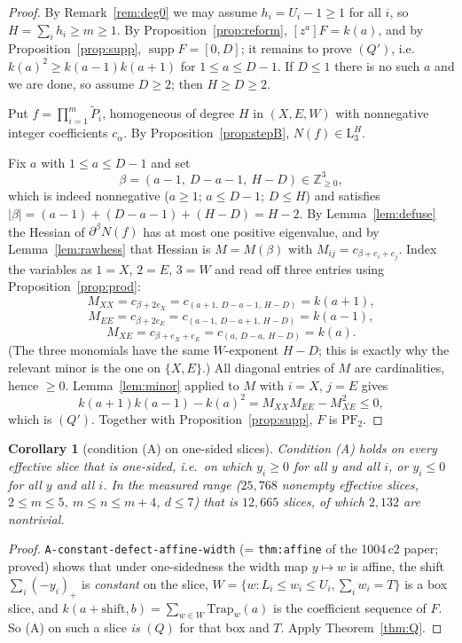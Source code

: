 \documentclass[11pt]{article}
\theoremstyle{plain}
\newtheorem{corollary}[theorem]{Corollary}
\theoremstyle{definition}
\DeclareMathOperator{\supp}{supp}
\newcommand{\PFtwo}{\mathrm{PF}_2}
\newcommand{\Z}{\mathbb{Z}}
\newcommand{\Pt}{\widetilde P}
\begin{document}
\begin{proof}
By Remark~\ref{rem:deg0} we may assume $h_i=U_i-1\ge1$ for all $i$, so $H=\sum_ih_i\ge m\ge1$.
By Proposition~\ref{prop:reform}, $[z^a]F=k(a)$, and by Proposition~\ref{prop:supp},
$\supp F=[0,D]$; it remains to prove $(Q')$, i.e.\ $k(a)^2\ge k(a-1)k(a+1)$ for
$1\le a\le D-1$. If $D\le1$ there is no such $a$ and we are done, so assume $D\ge2$; then
$H\ge D\ge2$.

Put $f=\prod_{i=1}^m\Pt_i$, homogeneous of degree $H$ in $(X,E,W)$ with nonnegative integer
coefficients $c_\alpha$. By Proposition~\ref{prop:stepB}, $N(f)\in\mathrm L^H_3$.

Fix $a$ with $1\le a\le D-1$ and set
\[
  \beta=(a-1,\ D-a-1,\ H-D)\in\Z_{\ge0}^3 ,
\]
which is indeed nonnegative ($a\ge1$; $a\le D-1$; $D\le H$) and satisfies
$|\beta|=(a-1)+(D-a-1)+(H-D)=H-2$. By Lemma~\ref{lem:defuse} the Hessian of
$\partial^\beta N(f)$ has at most one positive eigenvalue, and by Lemma~\ref{lem:rawhess}
that Hessian is $M=M(\beta)$ with $M_{ij}=c_{\beta+e_i+e_j}$. Index the variables as
$1=X$, $2=E$, $3=W$ and read off three entries using Proposition~\ref{prop:prod}:
\[
  M_{XX}=c_{\beta+2e_X}=c_{(a+1,\,D-a-1,\,H-D)}=k(a+1),
\]
\[
  M_{EE}=c_{\beta+2e_E}=c_{(a-1,\,D-a+1,\,H-D)}=k(a-1),
\]
\[
  M_{XE}=c_{\beta+e_X+e_E}=c_{(a,\,D-a,\,H-D)}=k(a).
\]
(The three monomials have the same $W$-exponent $H-D$; this is exactly why the relevant
minor is the one on $\{X,E\}$.) All diagonal entries of $M$ are cardinalities, hence
$\ge0$. Lemma~\ref{lem:minor} applied to $M$ with $i=X$, $j=E$ gives
\[
  k(a+1)k(a-1)-k(a)^2=M_{XX}M_{EE}-M_{XE}^2\le0 ,
\]
which is $(Q')$. Together with Proposition~\ref{prop:supp}, $F$ is $\PFtwo$.
\end{proof}

\begin{corollary}[condition (A) on one-sided slices]\label{cor:A}
Condition (A) holds on every effective slice that is \emph{one-sided}, i.e.\ on which
$y_i\ge0$ for all $y$ and all $i$, or $y_i\le0$ for all $y$ and all $i$. In the measured
range ($25{,}768$ nonempty effective slices, $2\le m\le5$, $m\le n\le m+4$, $d\le7$) that
is $12{,}665$ slices, of which $2{,}132$ are nontrivial.
\end{corollary}

\begin{proof}
\texttt{A-constant-defect-affine-width} (= \texttt{thm:affine} of the 1004\,c2 paper;
proved) shows that under one-sidedness the width map $y\mapsto w$ is affine, the shift
$\sum_i(-y_i)_+$ is \emph{constant} on the slice, $W=\{w:L_i\le w_i\le U_i,\sum_iw_i=T\}$ is
a box slice, and $k(a+\text{shift},b)=\sum_{w\in W}\mathrm{Trap}_w(a)$ is the coefficient
sequence of $F$. So (A) on such a slice \emph{is} $(Q)$ for that box and $T$. Apply
Theorem~\ref{thm:Q}.
\end{proof}
\end{document}
